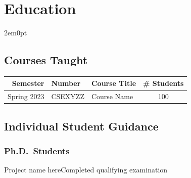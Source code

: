 \documentclass[11pt]{article}
\begin{document}
\section{Education}
\begin{adjustwidth}{2em}{0pt}

\subsection{Courses Taught}

\begin{center}
    \begin{tabular}{ r l l c }
        \hline\hline
        \bf Semester  &\bf Number & \bf Course Title & \bf \# Students \\
        \hline
        Spring 2023 & CSEXYZZ & Course Name & 100 \\
        \hline\hline
    \end{tabular}
\end{center}

\subsection{Individual Student Guidance}


\subsubsection{Ph.D.\ Students}

\begin{itemize}
        {Project name here}{Completed qualifying examination}
\end{itemize}


\end{adjustwidth}
\end{document}
